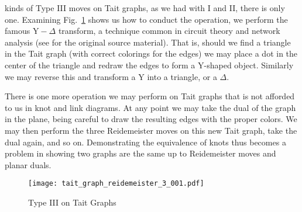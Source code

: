 \documentclass{article}
\theoremstyle{plain}
\begin{document}
        kinds of Type III moves on Tait graphs, as we had with I and II,
        there is only one. Examining
        Fig.~\ref{fig:tait_graph_reidemeister_3_001} shows us how to conduct
        the operation, we perform the famous
        $\textrm{Y}-\Delta$ transform, a technique common in circuit theory
        and network analysis (see \cite{KennellyYDelta} for the original
        source material). That is, should we find a triangle in the Tait
        graph (with correct colorings for the edges) we may place a dot in the
        center of the triangle and redraw the edges to form a
        $\textrm{Y}$-shaped object. Similarly we may reverse this and transform
        a $\textrm{Y}$ into a triangle, or a $\Delta$.
        \par\hfill\par
        There is one more operation we may perform on Tait graphs that is not
        afforded to us in knot and link diagrams. At any point we may take the
        dual of the graph in the plane, being careful to draw the resulting
        edges with the proper colors. We may then perform the three
        Reidemeister moves on this new Tait graph, take the dual again, and
        so on. Demonstrating the equivalence of knots thus becomes a problem
        in showing two graphs are the same up to Reidemeister moves and planar
        duals.
        \begin{figure}
            \centering
            \texttt{[image: tait\_graph\_reidemeister\_3\_001.pdf]}
            \caption{Type III on Tait Graphs}
            \label{fig:tait_graph_reidemeister_3_001}
        \end{figure}
\end{document}
